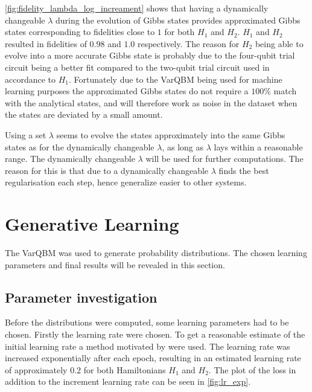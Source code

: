 \documentclass[../main.tex]{subfiles}
\begin{document}
\autoref{fig:fidelity_lambda_log_increament} shows that having a dynamically changeable $\lambda$ during the evolution of Gibbs states provides approximated Gibbs states corresponding to fidelities close to $1$ for both $H_1$ and $H_2$. $H_1$ and $H_2$ resulted in fidelities of $0.98$ and $1.0$ respectively. The reason for $H_2$ being able to evolve into a more accurate Gibbs state is probably due to the four-qubit trial circuit being a better fit compared to the two-qubit trial circuit used in accordance to $H_1$. Fortunately due to the VarQBM being used for machine learning purposes the approximated Gibbs states do not require a $100\%$ match with the analytical states\cite{VQB:litteraturelist}, and will therefore work as noise in the dataset when the states are deviated by a small amount.

Using a set $\lambda$ seems to evolve the states approximately into the same Gibbs states as for the dynamically changeable $\lambda$, as long as $\lambda$ lays within a reasonable range. The dynamically changeable $\lambda$ will be used for further computations. The reason for this is that due to a dynamically changeable $\lambda$ finds the best regularisation each step, hence generalize easier to other systems.

\section{Generative Learning}
The VarQBM was used to generate probability distributions. The chosen learning parameters and final results will be revealed in this section.

\subsection{Parameter investigation}
Before the distributions were computed, some learning parameters had to be chosen. Firstly the learning rate were chosen. To get a reasonable estimate of the initial learning rate a method motivated by \cite{cyclical_lr} were used. The learning rate was increased exponentially after each epoch, resulting in an estimated learning rate of approximately $0.2$ for both Hamiltonians $H_1$ and $H_2$. The plot of the loss in addition to the increment learning rate can be seen in \ref{fig:lr_exp}.
\end{document}
